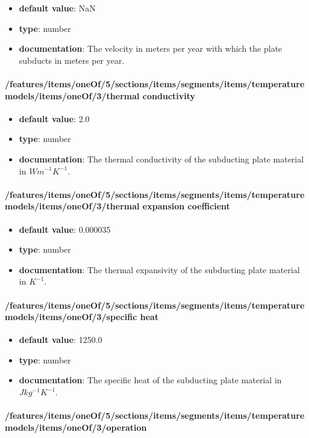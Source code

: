 \begin{itemize}\item {\bf default value}: NaN
\item {\bf type}: number
\item {\bf documentation}: The velocity in meters per year with which the plate subducts in meters per year.
\end{itemize}\paragraph{/features/items/oneOf/5/sections/items/segments/items/temperature models/items/oneOf/3/thermal conductivity}
\begin{itemize}\item {\bf default value}: 2.0
\item {\bf type}: number
\item {\bf documentation}: The thermal conductivity of the subducting plate material in $W m^{-1} K^{-1}$.
\end{itemize}\paragraph{/features/items/oneOf/5/sections/items/segments/items/temperature models/items/oneOf/3/thermal expansion coefficient}
\begin{itemize}\item {\bf default value}: 0.000035
\item {\bf type}: number
\item {\bf documentation}: The thermal expansivity of the subducting plate material in $K^{-1}$.
\end{itemize}\paragraph{/features/items/oneOf/5/sections/items/segments/items/temperature models/items/oneOf/3/specific heat}
\begin{itemize}\item {\bf default value}: 1250.0
\item {\bf type}: number
\item {\bf documentation}: The specific heat of the subducting plate material in $J kg^{-1} K^{-1}$.
\end{itemize}\paragraph{/features/items/oneOf/5/sections/items/segments/items/temperature models/items/oneOf/3/operation}
